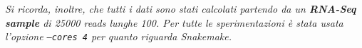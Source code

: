 \documentclass[a4paper,12pt, oneside]{book}
\begin{document}
\textit{Si ricorda, inoltre, che tutti i dati sono stati calcolati partendo da
  un \textbf{RNA-Seq sample} di 25000 reads lunghe 100. Per tutte le
  sperimentazioni è stata usata l'opzione \texttt{--cores 4} per quanto riguarda
  \emph{Snakemake}.}\\
\\

\end{document}
